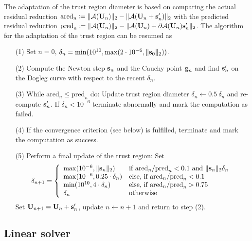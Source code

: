 The adaptation of the trust region diameter is based on comparing the actual residual reduction $\textrm{ared}_n \coloneqq \| \mathcal{A} (\textbf{U}_n) \|_2 - \| \mathcal{A} (\textbf{U}_n  + \textbf{s}'_{n} ) \|_2$ with the predicted residual reduction
$\textrm{pred}_n \coloneqq \| \mathcal{A} (\textbf{U}_n) \|_2 - \| \mathcal{A} (\textbf{U}_n )   + \partial \mathcal{A} (\textbf{U}_n ) \textbf{s}'_{n} \|_2$. The algorithm for the adaptation of the trust region can be resumed as
\begin{itemize}
	\item[(1)]
	Set $n=0$, $\delta_n = \min(10^{10}, \max(2 \cdot 10^{-6}, \| \textbf{s}_0 \|_2 ))$.	
	\item[(2)]
	Compute the Newton step $\textbf{s}_n$ and the Cauchy point  $\textbf{g}_n$ and
	find $\textbf{s}'_n$ on the Dogleg curve with respect to the recent $\delta_n$.	
	\item[(3)]
	While $\textrm{ared}_n \leq \textrm{pred}_n$ do:
	Update trust region diameter $\delta_n \leftarrow 0.5 \ \delta_n$
	and re-compute $\textbf{s}'_n$.
	If $\delta_n < 10^{-6}$ terminate abnormally and mark the computation as failed.	
	\item[(4)]
	If the convergence criterion (see below) is fulfilled, terminate and mark the computation as success.	
	\item[(5)]
	Perform a final update of the trust region: Set
	\[
	\delta_{n+1} = \left\{ \begin{array}{ll}
		\max( 10^{-6}, \| \textbf{s}_n \|_2 ) & \text{if } \textrm{ared}_n / \textrm{pred}_n < 0.1 \text{ and } \| \textbf{s}_n \|_2 \delta_n \\
		\max( 10^{-6}, 0.25 \cdot \delta_n )    & \text{else, if } \textrm{ared}_n / \textrm{pred}_n < 0.1                                        \\
		\min( 10^{10}, 4 \cdot \delta_n )       & \text{else, if } \textrm{ared}_n / \textrm{pred}_n > 0.75                                       \\
		\delta_{n}                              & \text{otherwise}                                                                                \\
	\end{array} \right.
	\]
	Set $\textbf{U}_{n+1} = \textbf{U}_{n} + \textbf{s}'_{n} $, update $n \leftarrow n + 1$ and return to step (2).	
\end{itemize}
\subsection{Linear solver}\label{ssec:LinearSolver}


